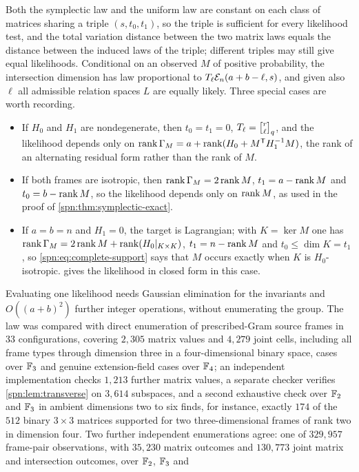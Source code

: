 Both the symplectic law and the uniform law are constant on each class of
matrices sharing a triple $(s,t_0,t_1)$, so the triple is sufficient for every
likelihood test, and the total variation distance between the two matrix laws
equals the distance between the induced laws of the triple; different triples
may still give equal likelihoods. Conditional on an observed $M$ of positive
probability, the intersection dimension has law proportional to
$T_\ell\mathcal{E}_n(a+b-\ell,s)$, and given also $\ell$ all admissible relation
spaces $L$ are equally likely. Three special cases are worth recording.
\begin{itemize}
\item If $H_0$ and $H_1$ are nondegenerate, then $t_0=t_1=0$,
$T_\ell=\spnqbin r\ell q$, and the likelihood depends only on
$\operatorname{rank}\Gamma_M=a+\operatorname{rank}(H_0+M^{\mathsf{T}}H_1^{-1}M)$, the rank of an alternating
residual form rather than the rank of $M$.
\item If both frames are isotropic, then $\operatorname{rank}\Gamma_M=2\operatorname{rank} M$,
$t_1=a-\operatorname{rank} M$ and $t_0=b-\operatorname{rank} M$, so the likelihood depends only on
$\operatorname{rank} M$, as used in the proof of \cref{spn:thm:symplectic-exact}.
\item If $a=b=n$ and $H_1=0$, the target is Lagrangian; with $K=\ker M$ one has
$\operatorname{rank}\Gamma_M=2\operatorname{rank} M+\operatorname{rank}(H_0|_{K\times K})$, $t_1=n-\operatorname{rank} M$ and
$t_0\le\dim K=t_1$, so \eqref{spn:eq:complete-support} says that $M$ occurs
exactly when $K$ is $H_0$-isotropic.  gives the
likelihood in closed form in this case.
\end{itemize}
Evaluating one likelihood needs Gaussian elimination for the invariants and
$O((a+b)^2)$ further integer operations, without enumerating the group. The
law was compared with direct enumeration of prescribed-Gram source frames in
$33$ configurations, covering $2{,}305$ matrix values and $4{,}279$ joint
cells, including all frame types through dimension three in a
four-dimensional binary space, cases over $\mathbb{F}_3$ and genuine extension-field
cases over $\mathbb{F}_4$; an independent implementation checks $1{,}213$ further
matrix values, a separate checker verifies \cref{spn:lem:transverse} on
$3{,}614$ subspaces, and a second exhaustive check over $\mathbb{F}_2$ and $\mathbb{F}_3$ in
ambient dimensions two to six finds, for instance, exactly $174$ of the $512$
binary $3\times3$ matrices supported for two three-dimensional frames of
rank two in dimension four. Two further independent enumerations agree: one
of $329{,}957$ frame-pair observations, with $35{,}230$ matrix outcomes and
$130{,}773$ joint matrix and intersection outcomes, over $\mathbb{F}_2$, $\mathbb{F}_3$ and
